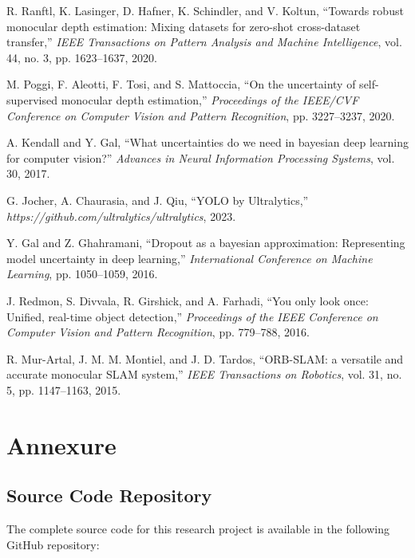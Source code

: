 \documentclass[12pt,oneside]{book}
\begin{document}
\begin{thebibliography}{99}

R. Ranftl, K. Lasinger, D. Hafner, K. Schindler, and V. Koltun,
``Towards robust monocular depth estimation: Mixing datasets for zero-shot cross-dataset transfer,''
\emph{IEEE Transactions on Pattern Analysis and Machine Intelligence}, vol. 44, no. 3, pp. 1623--1637, 2020.

M. Poggi, F. Aleotti, F. Tosi, and S. Mattoccia,
``On the uncertainty of self-supervised monocular depth estimation,''
\emph{Proceedings of the IEEE/CVF Conference on Computer Vision and Pattern Recognition}, pp. 3227--3237, 2020.

A. Kendall and Y. Gal,
``What uncertainties do we need in bayesian deep learning for computer vision?''
\emph{Advances in Neural Information Processing Systems}, vol. 30, 2017.

G. Jocher, A. Chaurasia, and J. Qiu,
``YOLO by Ultralytics,''
\emph{https://github.com/ultralytics/ultralytics}, 2023.

Y. Gal and Z. Ghahramani,
``Dropout as a bayesian approximation: Representing model uncertainty in deep learning,''
\emph{International Conference on Machine Learning}, pp. 1050--1059, 2016.

J. Redmon, S. Divvala, R. Girshick, and A. Farhadi,
``You only look once: Unified, real-time object detection,''
\emph{Proceedings of the IEEE Conference on Computer Vision and Pattern Recognition}, pp. 779--788, 2016.

R. Mur-Artal, J. M. M. Montiel, and J. D. Tardos,
``ORB-SLAM: a versatile and accurate monocular SLAM system,''
\emph{IEEE Transactions on Robotics}, vol. 31, no. 5, pp. 1147--1163, 2015.

\end{thebibliography}

\chapter*{Annexure}

\section*{Source Code Repository}

The complete source code for this research project is available in the following GitHub repository:
\end{document}
